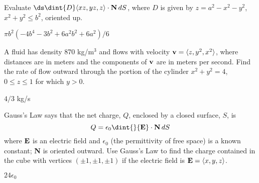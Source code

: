 \begin{exercises}
\exercise Evaluate $\ds \dint{D} \langle xz,yz,z\rangle\cdot {\bf
N}\,dS$, where $D$ is given by $z=a^2-x^2-y^2$, $x^2+y^2\le b^2$, 
oriented up.
\begin{answer} $\pi b^2(-4b^4-3b^2+6a^2b^2+6a^2)/6$
\end{answer}

\exercise A fluid has density 870 kg/m$^3$ and flows with velocity ${\bf v} =
 \langle z,y^2,x^2\rangle$, where distances are in meters and the
 components of ${\bf v}$ are in meters per second.  Find the rate of flow
 outward through the portion of the cylinder $x^2+y^2 = 4$, $0\leq
 z\leq 1$ for which $y>0$.
\begin{answer} $4/3$ kg/s
\end{answer}

\exercise Gauss's Law says that the net charge, $Q$,
enclosed by a closed surface, $S$, is 
$$Q=\epsilon_0 \dint{} {\bf E}\cdot {\bf N}\,dS$$ 
where ${\bf E}$ is an electric field and $\epsilon_0$ (the
permittivity of free space) is a known constant; {\bf N} is oriented
outward. 
Use Gauss's Law to find the charge contained in the cube with vertices
$(\pm 1, \pm 1, \pm 1)$ if the electric field is 
${\bf E} = \langle x,y,z\rangle$.
\begin{answer} $24\epsilon_0$
\end{answer}

\end{exercises}

